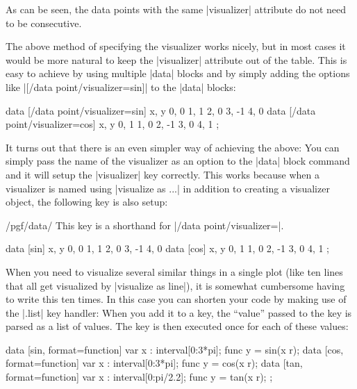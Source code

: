 As can be seen, the data points with the same |visualizer| attribute
do not need to be consecutive.

The above method of specifying the visualizer works nicely, but in
most cases it would be more natural to keep the |visualizer| attribute
out of the table. This is easy to achieve by using multiple |data|
blocks and by simply adding the options like
|[/data point/visualizer=sin]| to the |data| blocks:

\begin{codeexample}[width=7cm]
\tikz \datavisualization
 [scientific clean axes,
  visualize as line=sin,
  visualize as line=cos]
data [/data point/visualizer=sin] {
  x, y
  0, 0
  1, 1
  2, 0
  3, -1
  4, 0
}
data [/data point/visualizer=cos] {
  x, y
  0, 1
  1, 0
  2, -1
  3, 0
  4, 1
};
\end{codeexample}

It turns out that there is an even simpler way of achieving the above:
You can simply pass the name of the visualizer as an option to the
|data| block command and it will setup the |visualizer| key
correctly. This works because when a visualizer is named using
|visualize as ...| in addition to creating a visualizer object, the
following key is also setup: 
\begin{key}{/pgf/data/}
  This key is a shorthand for
  |/data point/visualizer=|.  
\end{key}

\begin{codeexample}[width=7cm]
\tikz \datavisualization
 [scientific clean axes,
  visualize as line=sin,
  visualize as line=cos]
data [sin] {
  x, y
  0, 0
  1, 1
  2, 0
  3, -1
  4, 0
}
data [cos] {
  x, y
  0, 1
  1, 0
  2, -1
  3, 0
  4, 1
};
\end{codeexample}

When you need to visualize several similar things in a single plot
(like ten lines that all get visualized by |visualize as line|), it is
somewhat cumbersome having to write this ten times. In this case you
can shorten your code by making use of the |.list| key handler: When
you add it to a key, the ``value'' passed to the key is parsed as a
list of values. The key is then executed once for each of these
values:

\begin{codeexample}[width=7cm]
\tikz \datavisualization
 [scientific clean axes,
  visualize as line/.list={sin, cos, tan}]
data [sin, format=function] {
  var x : interval[0:3*pi];
  func y = sin(\value x r);
}
data [cos, format=function] {
  var x : interval[0:3*pi];
  func y = cos(\value x r);
}
data [tan, format=function] {
  var x : interval[0:pi/2.2];
  func y = tan(\value x r);
};
\end{codeexample}



